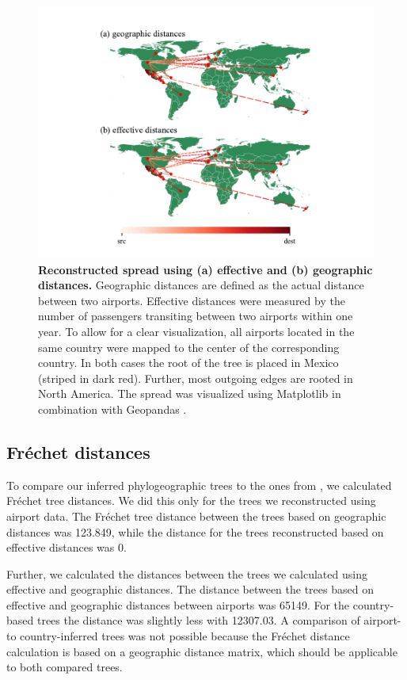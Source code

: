 \documentclass{article}
\begin{document}
\begin{figure}[!ht]
    \centering
    \includegraphics[width=\linewidth,trim={1.5cm 0 1.5cm 0}]{country_effective_country.pdf}
    \caption{\textbf{Reconstructed spread using (a) effective and (b) geographic distances.} Geographic distances are defined as the actual distance between two airports. Effective distances were measured by the number of passengers transiting between two airports within one year. To allow for a clear visualization, all airports located in the same country were mapped to the center of the corresponding country. In both cases the root of the tree is placed in Mexico (striped in dark red). Further, most outgoing edges are rooted in North America. The spread was visualized using Matplotlib \cite{MatplotlibVisualizationPython} in combination with Geopandas \cite{GeoPandas12GeoPandas}.}%
    \label{fig:world_comp}
\end{figure}

\subsection{Fr\'{e}chet distances}
To compare our inferred phylogeographic trees to the ones from \cite{reimeringPhylogeographicReconstructionUsing2020}, we calculated Fr\'{e}chet tree distances. We did this only for the trees we reconstructed using airport data. The Fr\'{e}chet tree distance between the trees based on geographic distances was 123.849, while the distance for the trees reconstructed based on effective distances was 0.

Further, we calculated the distances between the trees we calculated using effective and geographic distances. The distance between the trees based on effective and geographic distances between airports was 65149. For the country-based trees the distance was slightly less with 12307.03. A comparison of airport- to country-inferred trees was not possible because the Fr\'{e}chet distance calculation is based on a geographic distance matrix, which should be applicable to both compared trees.
\end{document}
